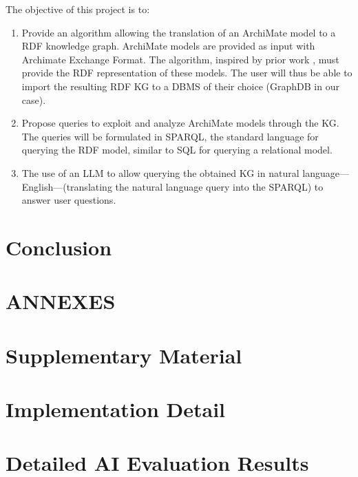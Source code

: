 \documentclass[12pt, a4paper]{report}
\begin{document}
The objective of this project is to:

\begin{enumerate}
    \item Provide an algorithm allowing the translation of an ArchiMate model to a RDF knowledge graph. ArchiMate models are provided as input with Archimate Exchange Format\parencite{archimateExc}. The algorithm, inspired by prior work \parencite{glaser2022model}, must provide the RDF representation of these models. The user will thus be able to import the resulting RDF KG to a DBMS of their choice (GraphDB in our case).
    \item Propose queries to exploit and analyze ArchiMate models through the KG. The queries will be formulated in SPARQL, the standard language for querying the RDF model, similar to SQL for querying a relational model.
    \item The use of an LLM to allow querying the obtained KG in natural language---English---(translating the natural language query into the SPARQL) to answer user questions.
\end{enumerate}







\chapter*{Conclusion}


\appendix
\fontsize{10pt}{12pt}\selectfont
\renewcommand{\appendixname}{Annex}
\chapter*{ANNEXES}
\chapter{Supplementary Material}

\chapter{Implementation Detail}
\label{chap:annexeB}

\chapter{Detailed AI Evaluation Results}

\fontsize{12pt}{14.5pt}\selectfont
\clearpage
\printbibliography[title={References}, heading=bibintoc]
\end{document}
